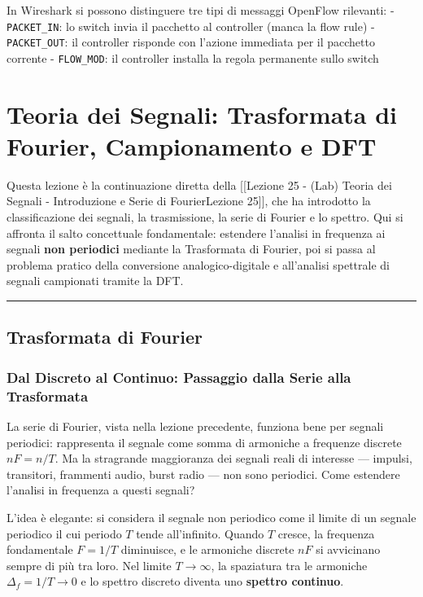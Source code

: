 \documentclass[
  italian,
  openany]{book}
\begin{document}
In Wireshark si possono distinguere tre tipi di messaggi OpenFlow
rilevanti: - \texttt{PACKET\_IN}: lo switch invia il pacchetto al
controller (manca la flow rule) - \texttt{PACKET\_OUT}: il controller
risponde con l'azione immediata per il pacchetto corrente -
\texttt{FLOW\_MOD}: il controller installa la regola permanente sullo
switch

\newpage

\chapter{Teoria dei Segnali: Trasformata di Fourier, Campionamento e
DFT}\label{teoria-dei-segnali-trasformata-di-fourier-campionamento-e-dft}

Questa lezione è la continuazione diretta della {[}{[}Lezione 25 - (Lab)
Teoria dei Segnali - Introduzione e Serie di Fourier\textbar Lezione
25{]}{]}, che ha introdotto la classificazione dei segnali, la
trasmissione, la serie di Fourier e lo spettro. Qui si affronta il salto
concettuale fondamentale: estendere l'analisi in frequenza ai segnali
\textbf{non periodici} mediante la Trasformata di Fourier, poi si passa
al problema pratico della conversione analogico-digitale e all'analisi
spettrale di segnali campionati tramite la DFT.

\begin{center}\rule{0.5\linewidth}{0.5pt}\end{center}

\section{Trasformata di Fourier}\label{trasformata-di-fourier}

\subsection{Dal Discreto al Continuo: Passaggio dalla Serie alla
Trasformata}\label{dal-discreto-al-continuo-passaggio-dalla-serie-alla-trasformata}

La serie di Fourier, vista nella lezione precedente, funziona bene per
segnali periodici: rappresenta il segnale come somma di armoniche a
frequenze discrete \(nF = n/T\). Ma la stragrande maggioranza dei
segnali reali di interesse --- impulsi, transitori, frammenti audio,
burst radio --- non sono periodici. Come estendere l'analisi in
frequenza a questi segnali?

L'idea è elegante: si considera il segnale non periodico come il limite
di un segnale periodico il cui periodo \(T\) tende all'infinito. Quando
\(T\) cresce, la frequenza fondamentale \(F = 1/T\) diminuisce, e le
armoniche discrete \(nF\) si avvicinano sempre di più tra loro. Nel
limite \(T \to \infty\), la spaziatura tra le armoniche
\(\Delta_f = 1/T \to 0\) e lo spettro discreto diventa uno
\textbf{spettro continuo}.
\end{document}
